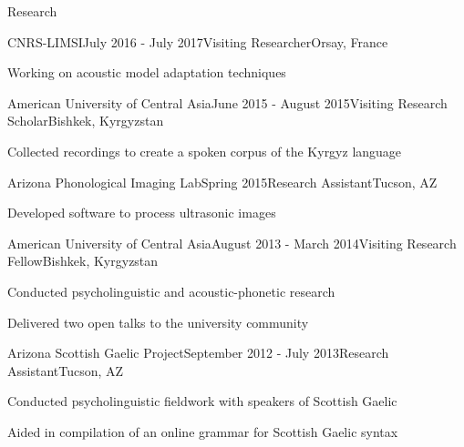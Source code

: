 \documentclass{resume} %
\begin{document}

\vspace{1.0cm}



\begin{rSection}{Research}

\begin{rSubsection}{CNRS-LIMSI}{July 2016 - July 2017}{Visiting Researcher}{Orsay, France}
\item Working on acoustic model adaptation techniques
\end{rSubsection}

\begin{rSubsection}{American University of Central Asia}{June 2015 - August 2015}{Visiting Research Scholar}{Bishkek, Kyrgyzstan}
\item Collected recordings to create a spoken corpus of the Kyrgyz language
\end{rSubsection}


\begin{rSubsection}{Arizona Phonological Imaging Lab}{Spring 2015}{Research Assistant}{Tucson, AZ}
\item Developed software to process ultrasonic images
\end{rSubsection}


\begin{rSubsection}{American University of Central Asia}{August 2013 - March 2014}{Visiting Research Fellow}{Bishkek, Kyrgyzstan}
\item Conducted psycholinguistic and acoustic-phonetic research
\item Delivered two open talks to the university community
\end{rSubsection}

\begin{rSubsection}{Arizona Scottish Gaelic Project}{September 2012 - July 2013}{Research Assistant}{Tucson, AZ}
\item Conducted psycholinguistic fieldwork with speakers of Scottish Gaelic
\item Aided in compilation of an online grammar for Scottish Gaelic syntax
\end{rSubsection}


\end{rSection}
\end{document}
